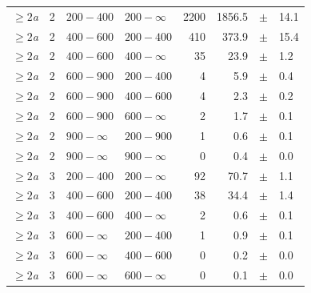 \begin{table}[!h]
\begin{tabular}{rrllrrcl}
$\geq 2${\it a}\T & 2 & $ 200- 400$ & $200-\infty$ &   2200 &   1856.5 &$\pm$&   14.1 \\
$\geq 2${\it a}\T & 2 & $ 400- 600$ & $200-400$ &    410 &    373.9 &$\pm$&   15.4 \\
$\geq 2${\it a} & 2 & $ 400- 600$ & $400-\infty$ &     35 &     23.9 &$\pm$&    1.2 \\
$\geq 2${\it a}\T & 2 & $ 600- 900$ & $200-400$ &      4 &      5.9 &$\pm$&    0.4 \\
$\geq 2${\it a} & 2 & $ 600- 900$ & $400-600$ &      4 &      2.3 &$\pm$&    0.2 \\
$\geq 2${\it a} & 2 & $ 600- 900$ & $600-\infty$ &      2 &      1.7 &$\pm$&    0.1 \\
$\geq 2${\it a}\T & 2 & $ 900- \infty$ & $200-900$ &      1 &      0.6 &$\pm$&    0.1 \\
$\geq 2${\it a} & 2 & $ 900- \infty$ & $900-\infty$ &      0 &      0.4 &$\pm$&    0.0 \\
$\geq 2${\it a}\T & 3 & $ 200- 400$ & $200-\infty$ &     92 &     70.7 &$\pm$&    1.1 \\
$\geq 2${\it a}\T & 3 & $ 400- 600$ & $200-400$ &     38 &     34.4 &$\pm$&    1.4 \\
$\geq 2${\it a} & 3 & $ 400- 600$ & $400-\infty$ &      2 &      0.6 &$\pm$&    0.1 \\
$\geq 2${\it a}\T & 3 & $ 600- \infty$ & $200-400$ &      1 &      0.9 &$\pm$&    0.1 \\
$\geq 2${\it a} & 3 & $ 600- \infty$ & $400-600$ &      0 &      0.2 &$\pm$&    0.0 \\
$\geq 2${\it a} & 3 & $ 600- \infty$ & $600-\infty$ &      0 &      0.1 &$\pm$&    0.0 \\
    \hline
  \end{tabular}
\end{table}

